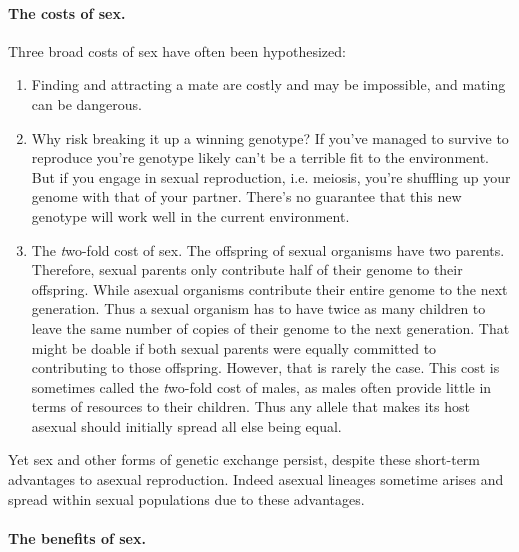 \paragraph{The costs of sex.}
Three broad costs of sex have often been hypothesized:
\begin{enumerate}
\item  Finding and attracting a mate are costly and may be impossible, and mating can be dangerous.
\item  Why risk breaking it up a winning genotype? If you've managed to survive to reproduce you're genotype likely can't be a terrible fit to the environment. But if you engage in sexual reproduction, i.e. meiosis, you're shuffling up your genome with that of your partner. There's no guarantee that this new genotype will work well in the current environment. 
\item The  {\emph two-fold cost of sex}. The offspring of sexual organisms have two parents. Therefore, sexual parents only contribute half of their genome to their offspring. While asexual organisms contribute their entire genome to the next generation. Thus a sexual organism has to have twice as many children to leave the same number of copies of their genome to the next generation. That might be doable if both sexual parents were equally committed to contributing to those offspring. However, that is rarely the case. This cost is sometimes called the {\emph two-fold cost of males}, as males often provide little in terms of resources to their children. Thus any allele that makes its host asexual should initially spread all else being equal. 
\end{enumerate}
Yet sex and other forms of genetic exchange persist, despite these short-term advantages to asexual reproduction. Indeed asexual lineages sometime arises and spread within sexual populations due to these advantages. 

\paragraph{The benefits of sex.}

